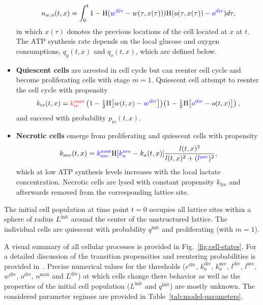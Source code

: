 \documentclass[10pt,letterpaper]{article}
\newcommand{\Heaviside}[1]{{\mathrm{H}\!\left[#1\right]}}
\newcommand{\sI}[1]{{\color{red}#1}}
\newcommand{\sII}[1]{{\color{blue}#1}}
\begin{document}
\begin{itemize}
\begin{equation*}
	n_{w,o}(t,x) = \int_{0}^{t}  1 -  \mathrm{H}(\sII{w^{\text{div}}}-w(\tau,x(\tau)))\mathrm{H}(o(\tau,x(\tau)) - \sII{o^{\text{div}}}) d\tau,
\end{equation*}
in which $x(\tau)$ denotes the previous locations of the cell located at $x$ at $t$. The ATP synthesis rate depends on the local glucose and oxygen consumptions, $q_g(t,x)$ and $q_o(t,x)$, which are defined below.
%
\item \textbf{Quiescent cells} are arrested in cell cycle but can reenter cell cycle and become proliferating cells with stage $m = 1$. Quiescent cell attempt to reenter the cell cycle with propensity
\begin{equation*}
	k_{\text{re}}(t,x) = \sI{k_{\text{re}}^{\max}} \left(1 - \tfrac{1}{2} \Heaviside{w(t,x)-\sII{w^{\text{div}}}}\right) \! \left(1 - \tfrac{1}{2} \Heaviside{\sII{o^{\text{div}}} - o(t,x)}\right),
\end{equation*}
and succeed with probability $p_{\text{re}}(t,x)$.
%
\item \textbf{Necrotic cells} emerge from proliferating and quiescent cells with propensity
\begin{equation*}
	k_{\text{nec}}(t,x) = \sII{k_{\text{nec}}^{\max}} \Heaviside{\sII{k_a^{\text{nec}}}-k_a(t,x)} \frac{l(t,x)^{2}}{l(t,x)^{2} + (\sII{l^{\text{nec}}})^{2}},
\end{equation*}
which at low ATP synthesis levels increases with the local lactate concentration. Necrotic cells are lysed with constant propensity $k_{\text{lys}}$ and afterwards removed from the corresponding lattice site.
\end{itemize}
The initial cell population at time point $t = 0$ occupies all lattice sites within a sphere of radius \sI{$L^{\text{init}}$} around the center of the unstructured lattice. The individual cells are quiescent with probability \sI{$q^{\text{init}}$} and proliferating (with $m=1$). 

A visual summary of all cellular processes is provided in Fig.~\ref{fig:cell-states}. For a detailed discussion of the transition propensities and reentering probabilities is provided in~\cite{Jagiella2012,JagiellaMul2015}. Precise numerical values for the thresholds ($e^{\text{div}}$, $k_a^{\text{div}}$, $k_a^{\text{nec}}$, $l^{\text{div}}$, $l^{\text{nec}}$, $w^{\text{div}}$, $o^{\text{div}}$, $n^{\max}$ and $L^{\text{div}}$) at which cells change there behavior as well as the properties of the initial cell population (\sI{$L^{\text{init}}$} and \sI{$q^{\text{init}}$}) are mostly unknown. The considered parameter regimes are provided in Table~\ref{tab:model-parameters}.
\end{document}
